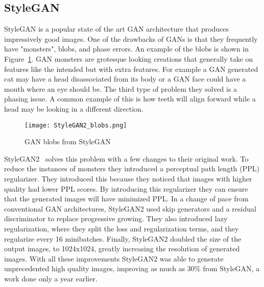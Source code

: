 %
%

\subsection{StyleGAN}
StyleGAN is a popular state of the art GAN architecture that produces
impressively good images. One of the drawbacks of GANs is that they frequently
have "monsters", blobs, and phase errors. An example of the blobs is shown in
Figure~\ref{fig:blobs}. GAN monsters are grotesque looking creations that
generally take on features like the intended but with extra features. For
example a GAN generated cat may have a head disassociated from its body or a GAN
face could have a mouth where an eye should be. The third type of problem they
solved is a phasing issue. A common example of this is how teeth will align
forward while a head may be looking in a different direction.

\begin{figure}[ht]
\centering
\texttt{[image: StyleGAN2\_blobs.png]}
\caption{GAN blobs from StyleGAN}
\label{fig:blobs}
\end{figure}

StyleGAN2~\cite{Karras2019stylegan2} solves this problem with a few changes to their original work. To
reduce the instances of monsters they introduced a perceptual path length (PPL)
regularizer. They introduced this because they noticed that images with higher
quality had lower PPL scores. By introducing this regularizer they can ensure
that the generated images will have minimized PPL. In a change of pace from
conventional GAN architectures, StyleGAN2 used skip generators and a residual
discriminator to replace progressive growing. They also introduced lazy
regularization, where they split the loss and regularization terms, and they
regularize every 16 minibatches. Finally, StyleGAN2 doubled the size of the
output images, to 1024x1024, greatly increasing the resolution of generated
images. With all these improvements StyleGAN2 was able to generate unprecedented
high quality images, improving as much as 30\% from StyleGAN, a work done only a
year earlier. 
